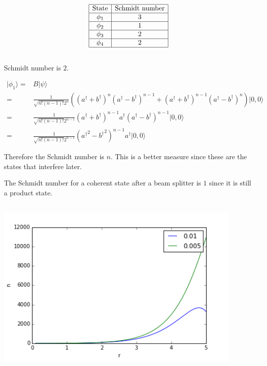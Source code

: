 \documentclass[10pt,fleqn]{article}
\newcommand{\eqar}[1]
{
  \begin{align*}
    #1
  \end{align*}
}
\newcommand{\paren}[1]{{\left({#1}\right)}}
\begin{document}
\subsection{}
\eqar{
  \begin{array}{|c|c|}
    \hline
    \text{State}&\text{Schmidt number}\\\hline
    \phi_1&3\\\hline
    \phi_2&1\\\hline
    \phi_3&2\\\hline
    \phi_4&2\\\hline
  \end{array}
}
\subsection{}
Schmidt number is $2$.
\eqar{
  |\phi_1\rangle=&B|\psi\rangle\\
  =&\frac{1}{\sqrt{n!(n-1)!}2^n}\paren{\paren{a^\dagger+b^\dagger}^{n}\paren{a^\dagger-b^\dagger}^{n-1}+\paren{a^\dagger+b^\dagger}^{n-1}\paren{a^\dagger-b^\dagger}^{n}}|0,0\rangle\\
  =&\frac{1}{\sqrt{n!(n-1)!}2^{n-1}}\paren{a^\dagger+b^\dagger}^{n-1}a^\dagger\paren{a^\dagger-b^\dagger}^{n-1}|0,0\rangle\\
  =&\frac{1}{\sqrt{n!(n-1)!}2^{n-1}}\paren{{a^\dagger}^2-{b^\dagger}^2}^{n-1}a^\dagger|0,0\rangle
}
Therefore the Schmidt number is $n$. This is a better measure since these are the states that interfere later.

The Schmidt number for a coherent state after a beam splitter is $1$ since it is still a product state.

\subsection{}
\includegraphics[width=12cm]{4.png}
\end{document}
